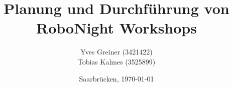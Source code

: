 
\titlehead
{
	\texttt{[image: images/logos/htw.jpg]}		
	\hfill
	\texttt{[image: images/logos/mindstorms.jpg]}		
}
	
\subject
{
	\Huge Dokumentation
}
	
\title
{
	Planung und Durchführung von RoboNight Workshops
}
	
\author
{	
	Yves Greiner (3421422)\\
	Tobias Kalmes (3525899)
}
	
\date
{
	\normalsize{Saarbrücken, \today}
}

\publishers
{
	Betreut durch Prof. Dr. Martina Lehser und\\
	Jochen Palz 
}	
\maketitle

